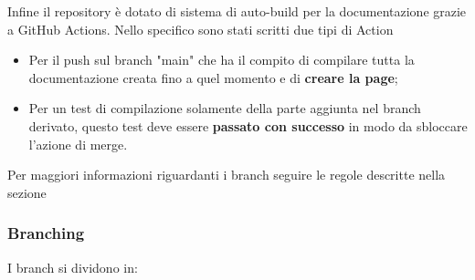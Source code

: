 Infine il repository è dotato di sistema di auto-build per la documentazione grazie a GitHub Actions. Nello specifico sono stati scritti due tipi di Action
\begin{itemize}
    \item Per il push sul branch "main" che ha il compito di compilare tutta la
          documentazione creata fino a quel momento e di \textbf{creare la page};
    \item Per un test di compilazione solamente della parte aggiunta nel branch derivato,
          questo test deve essere \textbf{passato con successo} in modo da sbloccare
          l'azione di merge.
\end{itemize}
Per maggiori informazioni riguardanti i branch seguire le regole descritte nella sezione 

\subsubsection{Branching}\label{inf:branch}
I branch si dividono in:
